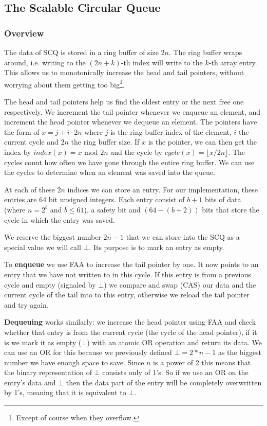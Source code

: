 \documentclass{article}      %
\begin{document}
\subsection{The Scalable Circular Queue}
\subsubsection{Overview}
The data of SCQ is stored in a ring buffer of size $2n$. The ring buffer wraps around, i.e. writing to the $(2n+k)$-th index will write to the $k$-th array entry. This allows us to monotonically increase the head and tail pointers, without worrying about them getting too big\footnote{Except of course when they overflow.}. 

The head and tail pointers help us find the oldest entry or the next free one respectively. 
We increment the tail pointer whenever we enqueue an element, and increment the head pointer whenever we dequeue an element.
The pointers have the form of $x =j + i \cdot 2n$ where $j$ is the ring buffer index of the element, $i$ the current cycle and $2n$ the ring buffer size. If $x$ is the pointer, we can then get the index by $index(x) = x \textrm{ mod } 2n$ and the cycle by $cycle(x) = \lfloor x / 2n\rfloor$. The cycles count how often we have gone through the entire ring buffer. We can use the cycles to determine when an element was saved into the queue.

At each of these $2n$ indices we can store an entry. For our implementation, these entries are 64 bit unsigned integers. Each entry consist of $b+1$ bits of data (where $n=2^b$ and $b \leq 61 $), a safety bit and $(64 -(b+2))$ bits that store the cycle in which the entry was saved.

We reserve the biggest number $2n -1$ that we can store into the SCQ as a special value we will call $\bot$. Its purpose is to mark an entry as empty.

To \textbf{enqueue} we use FAA to increase the tail pointer by one. It now points to an entry that we have not written to in this cycle. If this entry is from a previous cycle and empty (signaled by $\bot$) we compare and swap (CAS) our data and the current cycle of the tail into to this entry, otherwise we reload the tail pointer and try again.

\textbf{Dequeuing} works similarly: we increase the head pointer using FAA and check whether that entry is from the current cycle (the cycle of the head pointer), if it is we mark it as empty ($\bot$) with an atomic OR operation and return its data. We can use an OR for this because we previously defined $\bot = 2*n -1$ as the biggest number we have enough space to save. Since $n$ is a power of 2 this means that the binary representation of $\bot$ consists only of 1's. So if we use an OR on the entry's data and $\bot$ then the data part of the entry will be completely overwritten by 1's, meaning that it is equivalent to $\bot$.
\end{document}
